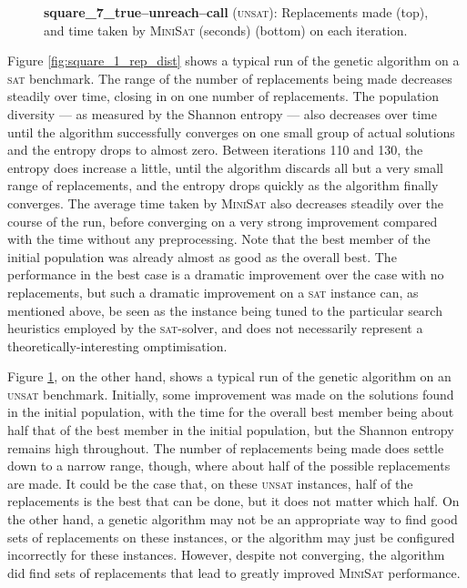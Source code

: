 \documentclass[proof,pdftex,11pt,a4,titlepage]{article}
\newcommand{\sat}{\textsc{sat}}
\newcommand{\unsat}{\textsc{unsat}}
\begin{document}
\begin{figure}[p]
  

  \vspace{1cm}

  
  \caption{{\bf square\_7\_true--unreach--call} (\unsat{}): Replacements made (top), and time taken by \textsc{MiniSat} (seconds) (bottom) on each iteration.}
  \label{fig:square_7_rep_dist}
\end{figure}

Figure \ref{fig:square_1_rep_dist} shows a typical run of the genetic algorithm on a \sat{} benchmark. The range of the number of replacements being made decreases steadily over time, closing in on one number of replacements. The population diversity --- as measured by the Shannon entropy --- also decreases over time until the algorithm successfully converges on one small group of actual solutions and the entropy drops to almost zero. Between iterations 110 and 130, the entropy does increase a little, until the algorithm discards all but a very small range of replacements, and the entropy drops quickly as the algorithm finally converges. The average time taken by \textsc{MiniSat} also decreases steadily over the course of the run, before converging on a very strong improvement compared with the time without any preprocessing. Note that the best member of the initial population was already almost as good as the overall best. The performance in the best case is a dramatic improvement over the case with no replacements, but such a dramatic improvement on a \sat{} instance can, as mentioned above, be seen as the instance being tuned to the particular search heuristics employed by the \sat{}-solver, and does not necessarily represent a theoretically-interesting omptimisation.

Figure \ref{fig:square_7_rep_dist}, on the other hand, shows a typical run of the genetic algorithm on an \unsat{} benchmark. Initially, some improvement was made on the solutions found in the initial population, with the time for the overall best member being about half that of the best member in the initial population, but the Shannon entropy remains high throughout. The number of replacements being made does settle down to a narrow range, though, where about half of the possible replacements are made. It could be the case that, on these \unsat{} instances, half of the replacements is the best that can be done, but it does not matter which half. On the other hand, a genetic algorithm may not be an appropriate way to find good sets of replacements on these instances, or the algorithm may just be configured incorrectly for these instances. However, despite not converging, the algorithm did find sets of replacements that lead to greatly improved \textsc{MiniSat} performance.
\end{document}
